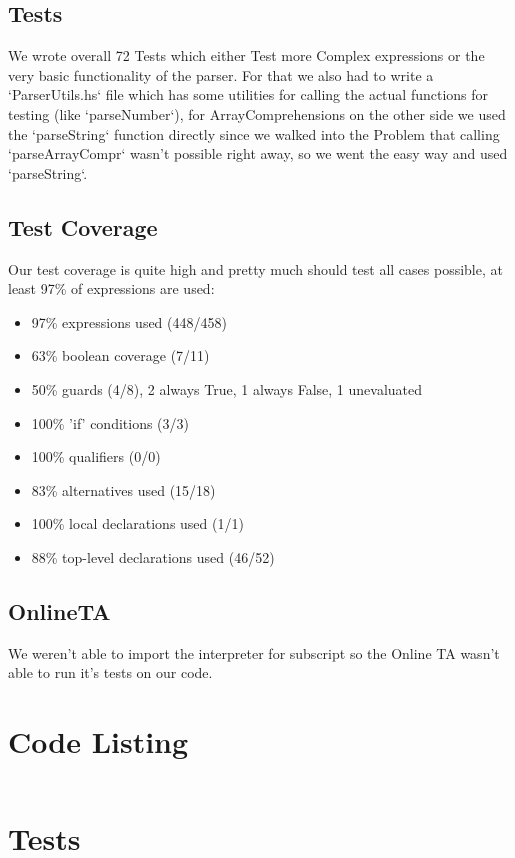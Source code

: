 \documentclass[12pt,a4paper]{article}
\begin{document}
\subsection{Tests}

We wrote overall 72 Tests which either Test more Complex expressions or the very basic functionality of the parser.
For that we also had to write a `ParserUtils.hs` file which has some utilities for calling the actual functions for testing (like `parseNumber`), for ArrayComprehensions on the other side we used the `parseString` function directly since we walked into the Problem that calling `parseArrayCompr` wasn't possible right away, so we went the easy way and used `parseString`.

\subsection{Test Coverage}
Our test coverage is quite high and pretty much should test all cases possible, at least 97\% of expressions are used:
\begin{itemize}
	\item  97\% expressions used (448/458)
 	\item 63\% boolean coverage (7/11)
     \item 50\% guards (4/8), 2 always True, 1 always False, 1 unevaluated
     \item 100\% 'if' conditions (3/3)
     \item 100\% qualifiers (0/0)
 	 \item 83\% alternatives used (15/18)
	 \item 100\% local declarations used (1/1)
 	 \item 88\% top-level declarations used (46/52)
\end{itemize}

\subsection{OnlineTA}
We weren't able to import the interpreter for subscript so the Online TA wasn't able to run it's tests on our code.
\appendix
\section{Code Listing}

\inputminted{haskell}{handin/src/Parser/Impl.hs}

\section{Tests}

\inputminted{haskell}{handin/tests/Test.hs}

\inputminted{haskell}{handin/tests/ParserUtils.hs}
\end{document}
